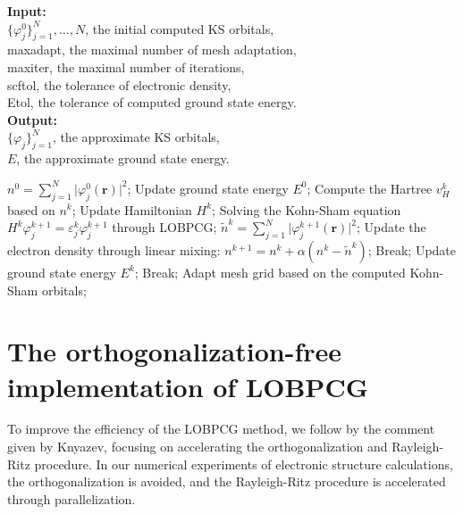 \documentclass[12pt]{article}
\numberwithin{figure}{section}
\numberwithin{table}{section}
\begin{document}
\begin{algorithm}[htbp]
	\caption{AFEM based SCF iteration for solving KS equations}
	\textbf{Input:}\\ 
	$\{\varphi_j^0\}_{j=1}^{N},\dots,N$, the initial computed KS orbitals,\\
	maxadapt, the maximal number of mesh adaptation,\\
	maxiter, the maximal number of iterations,\\
	scftol, the tolerance of electronic density,\\
	Etol, the tolerance of computed ground state energy.\\
	\textbf{Output:}\\
	$\{\varphi_j\}_{j=1}^{N}$, the approximate KS orbitals,\\
	$E$, the approximate ground state energy.\\
	\begin{algorithmic}[1]
		\State $n^0=\sum_{j=1}^N \vert\varphi^0_j(\boldsymbol{r})\vert^2$;
		\State Update ground state energy $E^0$;
		\State Compute the Hartree $v_H^k$ based on $n^k$;
		\State Update Hamiltonian $H^k$;
		\State Solving the Kohn-Sham equation $H^k \varphi_j^{k+1}=\varepsilon_j^{k} \varphi_j^{k+1}$ through LOBPCG;
		\State  $\tilde{n}^{k} = \sum_{j=1}^N \vert\varphi^{k+1}_j(\boldsymbol{r})\vert^2$;
		\State Update the electron density through linear mixing: $n^{k+1}=n^{k}+\alpha(n^k-\tilde{n}^{k})$;
		\State Break;
		\EndIf
		\EndFor
		\State Update ground state energy $E^k$;
		\State Break;
		\Else 
		\State Adapt mesh grid based on the computed Kohn-Sham orbitals; 
		\EndIf
		\EndFor
	\end{algorithmic}
	\label{SCFinKSDFT}
\end{algorithm}


\section{The orthogonalization-free implementation of LOBPCG}
To improve the efficiency of the LOBPCG method, we follow by the comment given by Knyazev, focusing on accelerating the orthogonalization and Rayleigh-Ritz procedure. In our numerical experiments of electronic structure calculations, the orthogonalization is avoided, and the Rayleigh-Ritz procedure is accelerated through parallelization. %
\end{document}
